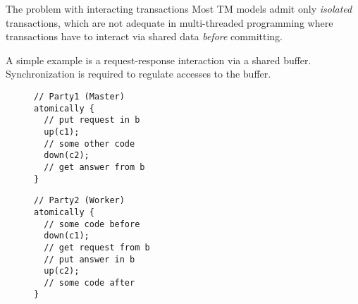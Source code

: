 \documentclass[beamer={noamsthm,10pt},target=bach]{thud}[2014/03/11]
\begin{document}


\begin{frame}[fragile]{The problem with interacting transactions}
Most TM models admit only \emph{isolated} transactions, which are not adequate in multi-threaded programming where transactions have to interact via shared data \emph{before} committing.

A simple example is a request-response interaction via a shared buffer. Synchronization is required to regulate accesses to the buffer.

\begin{figure}
\centering
\begin{minipage}[t]{0.5\textwidth}
\begin{BVerbatim}[baseline=t]
// Party1 (Master)
atomically {
  // put request in b
  up(c1);
  // some other code
  down(c2);
  // get answer from b
}
\end{BVerbatim}
\end{minipage}
\begin{minipage}[t]{0.4\textwidth}
\begin{BVerbatim}[baseline=t]
// Party2 (Worker)
atomically {
  // some code before
  down(c1);
  // get request from b
  // put answer in b
  up(c2);
  // some code after
}
\end{BVerbatim}
\end{minipage}
\end{figure}
\end{frame}



\end{document}
